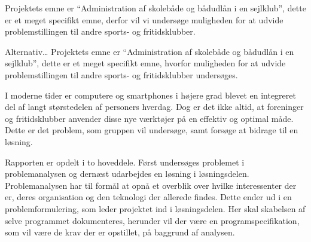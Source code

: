 Projektets emne er ``Administration af skolebåde og bådudlån i en sejlklub'', dette er et meget specifikt
emne, derfor vil vi undersøge muligheden for at udvide problemstillingen til andre sports- og fritidsklubber.

\begin{anfxnote}{Alternativ\ldots}
Projektets emne er ``Administration af skolebåde og bådudlån i en sejlklub'', dette er et meget specifikt
emne, hvorfor muligheden for at udvide problemstillingen til andre sports- og fritidsklubber undersøges.
\end{anfxnote}

I moderne tider er computere og smartphones i højere grad blevet en integreret del af langt størstedelen af
personers hverdag.   Dog er det ikke altid, at foreninger og fritidsklubber anvender disse nye
værktøjer på en effektiv og optimal måde. Dette er det problem, som gruppen vil undersøge, samt forsøge at
bidrage til en løsning. 

Rapporten er opdelt i to hoveddele. Først undersøges problemet i problemanalysen og dernæst udarbejdes en
løsning i løsningsdelen. Problemanalysen har til formål at opnå et overblik over hvilke interessenter der er,
deres organisation og den teknologi der allerede findes. Dette ender ud i en problemformulering, som leder
projektet ind i løsningsdelen. Her skal skabelsen af selve programmet dokumenteres, herunder vil der være en
programspecifikation, som vil være de krav der er opstillet, på baggrund af analysen. 
